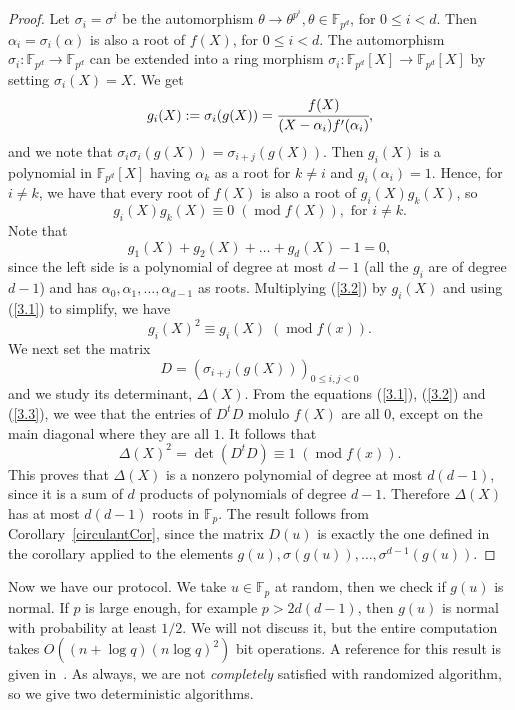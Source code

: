 \documentclass[a4paper,11pt]{article}
\theoremstyle{break}
\theoremstyle{sc}
\theoremstyle{definition}
\theoremstyle{remark}
\DeclareMathOperator{\Mod}{mod}
\begin{document}
\begin{proof}
  Let $\sigma_i=\sigma^i$ be the automorphism
  $\theta\to\theta^{p^i},\theta\in\mathbb{F}_{p^d}$, for $0\leq i <d$. Then
  $\alpha_i=\sigma_i(\alpha)$ is also a root of $f(X)$, for $0\leq i <d$. The
  automorphism $\sigma_i:\mathbb{F}_{p^d}\to\mathbb{F}_{p^d}$ can be extended
  into a ring morphism
  $\sigma_i:\mathbb{F}_{p^d}[X]\to\mathbb{F}_{p^d}[X]$ by setting
  $\sigma_i(X)=X$. We get
  \[
    g_i(X):=\sigma_i(g(X)) = \cfrac{f(X)}{(X-\alpha_i)f'(\alpha_i)},
  \]
  and we note that $\sigma_i\sigma_i(g(X)) = \sigma_{i+j}(g(X))$. Then
  $g_i(X)$ is a polynomial in $\mathbb{F}_{p^d}[X]$ having $\alpha_k$ as a root
  for $k\neq i$ and $g_i(\alpha_i)=1$. Hence, for $i\neq k$, we have that every
  root of $f(X)$ is also a root of $g_i(X)g_k(X)$, so
  \begin{equation}
    g_i(X)g_k(X) \equiv 0 \;(\Mod f(X)), \textrm{ for }i\neq k.
    \label{3.1}
  \end{equation}
  Note that 
  \begin{equation}
    g_1(X)+g_2(X)+\dots+g_d(X)-1=0,
    \label{3.2}
  \end{equation}
  since the left side is a polynomial of degree at most $d-1$ (all the
  $g_i$
  are of degree $d-1$) and has $\alpha_0,
  \alpha_1, \dots, \alpha_{d-1}$ as roots. Multiplying (\ref{3.2}) by $g_i(X)$
  and using (\ref{3.1}) to simplify, we have
  \begin{equation}
    g_i(X)^2 \equiv g_i(X)\;(\Mod f(x)).
    \label{3.3}
  \end{equation}
  We next set the matrix
  \[
    D=(\sigma_{i+j}(g(X)))_{0\leq i,j <0}
  \]
  and we study its determinant, $\Delta(X)$. From the equations
  (\ref{3.1}), (\ref{3.2}) and (\ref{3.3}), we wee that the entries of $D^tD$
  molulo $f(X)$ are all $0$, except on the main diagonal where they are all
  $1$. It follows that
  \[
    \Delta(X)^2 = \det(D^tD) \equiv 1\;(\Mod f(x)).
  \]
  This proves that $\Delta(X)$ is a nonzero polynomial of degree at most
  $d(d-1)$, since it is a sum of $d$ products of polynomials of degree
  $d-1$. Therefore $\Delta(X)$ has at most $d(d-1)$ roots in
  $\mathbb{F}_p$. The result follows from Corollary~\ref{circulantCor}, since the matrix
  $D(u)$ is exactly the one defined in the corollary applied to the elements
  $g(u), \sigma(g(u)),\dots,\sigma^{d-1}(g(u))$.
\end{proof}
Now we have our protocol. We take $u\in\mathbb{F}_p$ at random, then we check
if $g(u)$ is normal. If $p$ is large enough, for example $p>2d(d-1)$, then
$g(u)$ is normal with probability at least $1/2$. We will not discuss it, but
the entire computation takes $O((n+\log q)(n\log q)^2)$ bit operations.
A reference for this result is given in~\cite{Ga93}. As always, we are not
\emph{completely} satisfied with randomized algorithm, so we give two
deterministic algorithms.
\end{document}
